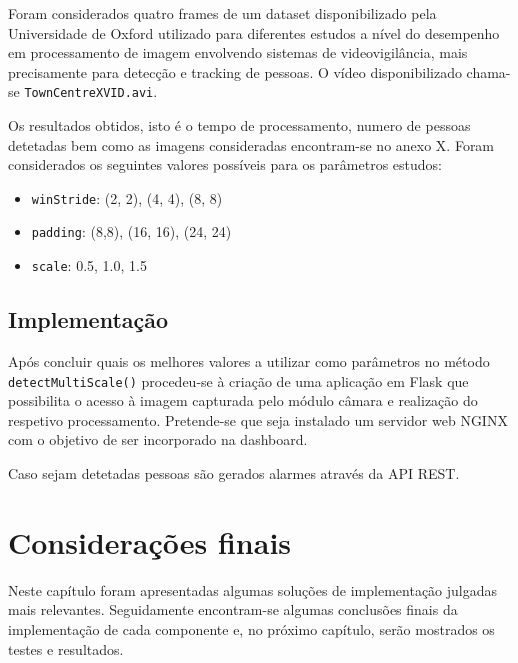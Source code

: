 Foram considerados quatro frames de um dataset disponibilizado pela Universidade de Oxford utilizado para diferentes estudos a nível do desempenho em processamento de imagem envolvendo sistemas de videovigilância, mais precisamente para detecção e tracking de pessoas\cite{imagProccdata}. O vídeo disponibilizado chama-se \texttt{TownCentreXVID.avi}. 

Os resultados obtidos, isto é o tempo de processamento, numero de pessoas detetadas bem como as imagens consideradas encontram-se no anexo X. Foram considerados os seguintes valores possíveis para os parâmetros estudos: 

\begin{itemize}
	\item \texttt{winStride}: (2, 2), (4, 4), (8, 8)
	
	\item \texttt{padding}: (8,8), (16, 16), (24, 24)
	
	\item \texttt{scale}: 0.5, 1.0, 1.5 
\end{itemize}


\subsection{Implementação}


Após concluir quais os melhores valores a utilizar como parâmetros no método \linebreak \texttt{detectMultiScale()}  procedeu-se à criação de uma aplicação em Flask que possibilita o acesso à imagem capturada pelo módulo câmara e realização do respetivo processamento. Pretende-se que seja instalado um servidor web NGINX com o objetivo de ser incorporado na dashboard. 


Caso sejam detetadas pessoas são gerados alarmes através da \ac{API} \ac{REST}. 
\fi







\section{Considerações finais}

Neste capítulo foram apresentadas algumas soluções de implementação julgadas mais relevantes. Seguidamente encontram-se algumas conclusões finais da implementação de cada componente e, no próximo capítulo, serão mostrados os testes e resultados. 



